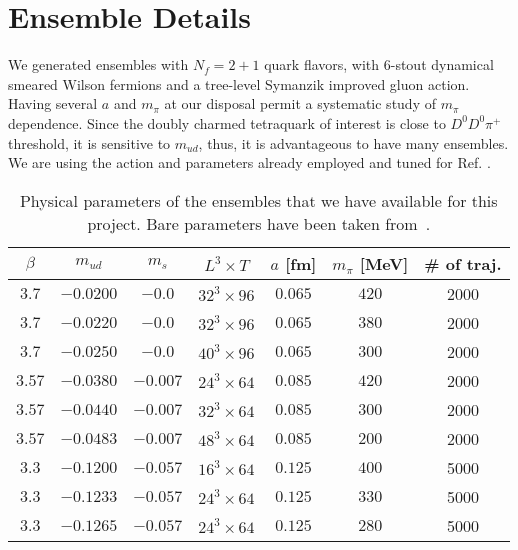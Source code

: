 \section{Ensemble Details}
We generated ensembles with $N_f = 2+1$ quark flavors, with 6-stout dynamical smeared Wilson fermions and a tree-level Symanzik improved gluon action. Having several $a$ and $m_{\pi}$ at our disposal permit a systematic study of $m_{\pi}$ dependence. Since the doubly charmed tetraquark of interest is close to $D^0D^0\pi^+$ threshold, it is sensitive to $m_{ud}$, thus, it is advantageous to have many ensembles. 
We are using the action and parameters already employed and tuned for Ref. \cite{Durr:2008zz}. 

\begin{table}[!h]
  \centering \footnotesize
  \begin{tabular}{|c|c|c|c|c|c|c|}
  \hline
  $\beta$  & $m_{ud}$   & $m_{s}$   & $L^3 \times T$  & $a$ [fm]   & $m_\pi$ [MeV]   & \# of traj. \\ \hline \hline
  $3.7$    & $-0.0200$  & $-0.0$    & $32^3\times96$  & $0.065$      & $420$         &  2000      \\ 
  $3.7$    & $-0.0220$  & $-0.0$    & $32^3\times96$  & $0.065$      & $380$         &  2000      \\ 
  $3.7$    & $-0.0250$  & $-0.0$    & $40^3\times96$  & $0.065$      & $300$         &  2000      \\ \hline
  $3.57$   & $-0.0380$  & $-0.007$  & $24^3\times64$  & $0.085$      & $420$         &  2000      \\ 
  $3.57$   & $-0.0440$  & $-0.007$  & $32^3\times64$  & $0.085$      & $300$         &  2000      \\ 
  $3.57$   & $-0.0483$  & $-0.007$  & $48^3\times64$  & $0.085$      & $200$         &  2000      \\ \hline
  $3.3$    & $-0.1200$  & $-0.057$  & $16^3\times64$  & $0.125$      & $400$         &  5000      \\ 
  $3.3$    & $-0.1233$  & $-0.057$  & $24^3\times64$  & $0.125$      & $330$         &  5000      \\ 
  $3.3$    & $-0.1265$  & $-0.057$  & $24^3\times64$  & $0.125$      & $280$         &  5000      \\ \hline
  \end{tabular}
  \caption{Physical parameters of the ensembles that we have available for this project. Bare parameters have been taken from~\cite{Durr:2008zz}. \label{tab:ensembles}}
  \end{table}


